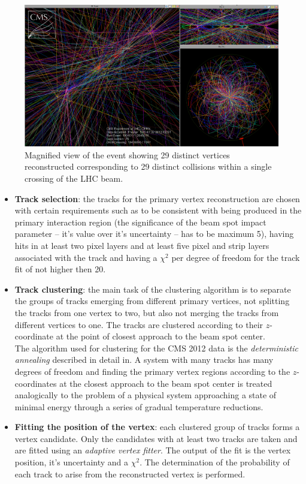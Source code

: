 \begin{figure}[t]
  \centering
  \includegraphics[width=1.0\textwidth]{04_event_reconstruction/plots/url.png}
  \caption{Magnified view of the event showing 29 distinct vertices reconstructed corresponding to 29 distinct collisions within a single crossing of the LHC beam.}
  \label{fig:HugePU}
\end{figure}
\begin{itemize}

 \item \textbf{Track selection}: the tracks for the primary vertex reconstruction are chosen with certain requirements such as to be consistent with being produced 
 in the primary interaction region (the significance of the beam spot impact parameter -- it's value over it's uncertainty -- has to be maximum 5), having hits in at least two pixel 
 layers and at least five pixel and strip layers associated with the track and having a $\chi^{2}$ per degree of freedom for the track fit of not higher then 20.
 \item \textbf{Track clustering}: the main task of the clustering algorithm is to separate the groups of tracks emerging from different primary vertices, not splitting 
 the tracks from one vertex to two, but also not merging the tracks from different vertices to one. The tracks are clustered according 
 to their $z$-coordinate at the point of closest approach to the beam spot center. 
 \\
 The algorithm used for clustering for the CMS 2012 data is the \textit{deterministic annealing} described in detail in\cite{rose_ieee1998}. A system with many tracks has many degrees
 of freedom and finding the primary vertex regions according to the $z$-coordinates at the closest approach to the beam spot center is treated analogically to the problem of a physical 
 system approaching a state of minimal energy through a series of gradual temperature reductions.
 \item \textbf{Fitting the position of the vertex}: each clustered group of tracks forms a vertex candidate. Only the candidates with at least two tracks are taken and are fitted
 using an \textit{adaptive vertex fitter}\cite{Frühwirth:1027031}. The output of the fit is the vertex position, it's uncertainty and a $\chi^{2}$. The determination of the probability
 of each track to arise from the reconstructed vertex is performed.
\end{itemize}

